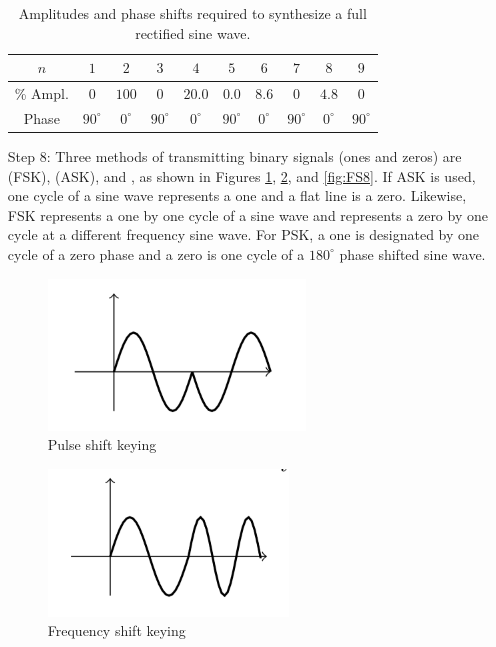 \begin{itemize}[leftmargin = 50pt]
        \begin{table}[H]
            \centering 
            \caption{Amplitudes and phase shifts required to synthesize a full rectified sine wave.}
            \begin{tabular}{|c|c|c|c|c|c|c|c|c|c|}
                \hline
                $n$ & $1$ & $2$ & $3$ & $4$ & $5$ & $6$ & $7$ & $8$ & $9$ \\ \hline
                \% Ampl. & $0$ & $100 $& $0$ & $20.0$ & $0.0$ & $8.6$ & $0$ & $4.8$ & $0$ \\ 
                Phase & $90^{\circ}$ & $0^{\circ}$ & $90^{\circ}$ & $0^{\circ}$ & $90^{\circ}$ & $0^{\circ}$ & $90^{\circ}$ & $0^{\circ}$ & $90^{\circ}$ \\ \hline
            \end{tabular}
            \label{tab:FS5}
        \end{table}
    \item[Step 8:] Three methods of transmitting binary signals (ones and zeros) are  (FSK),  (ASK), and , as shown in Figures \ref{fig:FS6}, \ref{fig:FS7}, and \ref{fig:FS8}. If ASK is used, one cycle of a sine wave represents a one and a flat line is a zero. Likewise, FSK represents a one by one cycle of a sine wave and represents a zero by one cycle at a different frequency sine wave. For PSK, a one is designated by one cycle of a zero phase and a zero is one cycle of a $180^{\circ}$ phase shifted sine wave.

        \begin{figure}[H]
    \centering
    \includegraphics[scale = 0.8]{Images/FS6.PNG}
    \caption{Pulse shift keying}
    \label{fig:FS6}
\end{figure}

\begin{figure}[H]
    \centering
    \includegraphics[scale = 0.8]{Images/FS7.PNG}
    \caption{Frequency shift keying}
    \label{fig:FS7}
\end{figure}


\end{itemize}
